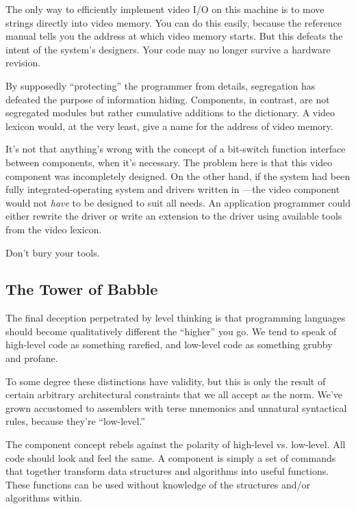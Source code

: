 The only way to efficiently implement video I/O on this machine is
to move strings directly into video memory. You can do this easily,
because the reference manual tells you the address at which video
memory starts. But this defeats the intent of the system's designers.
Your code may no longer survive a hardware revision.

By supposedly ``protecting'' the programmer from details, segregation
has defeated the purpose of information hiding. Components, in
contrast, are not segregated modules but rather cumulative additions
to the dictionary. A video lexicon would, at the very least, give a
name for the address of video memory.

It's not that anything's wrong with the concept of a bit-switch
function interface between components, when it's necessary. The
problem here is that this video component was incompletely
designed. On the other hand, if the system had been fully
integrated-operating system and drivers written in \Forth{}---the video
component would not \emph{have} to be designed to suit all needs. An
application programmer could either rewrite the driver or write an
extension to the driver using available tools from the video lexicon.

\begin{tip}
Don't bury your tools.
\end{tip}

\subsection{The Tower of Babble}

The final deception perpetrated by level thinking is that programming
languages should become qualitatively different the ``higher'' you go. We
tend to speak of high-level code as something rarefied, and low-level code
as something grubby and profane.

To some degree these distinctions have validity, but this is only the
result of certain arbitrary architectural constraints that we all accept as
the norm. We've grown accustomed to assemblers with terse mnemonics
and unnatural syntactical rules, because they're ``low-level.''

The component concept rebels against the polarity of high-level vs.
low-level. All code should look and feel the same. A component is simply
a set of commands that together transform data structures and
algorithms into useful functions. These functions can be used without
knowledge of the structures and/or algorithms within.

